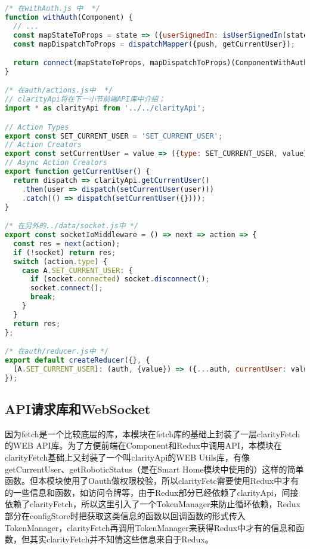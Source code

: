 \begin{lstlisting}[language={JavaScript}, label={lst:reduxDataFlow}, caption={Smart City模块权限校验Redux数据流相关代码}]
/* 在withAuth.js 中  */
function withAuth(Component) {
  // ...
  const mapStateToProps = state => ({userSignedIn: isUserSignedIn(state)});
  const mapDispatchToProps = dispatchMapper({push, getCurrentUser});

  return connect(mapStateToProps, mapDispatchToProps)(ComponentWithAuth);
}

/* 在auth/actions.js中  */
// clarityApi将在下一小节前端API库中介绍；
import * as clarityApi from '../../clarityApi';

// Action Types
export const SET_CURRENT_USER = 'SET_CURRENT_USER';
// Action Creators
export const setCurrentUser = value => ({type: SET_CURRENT_USER, value});
// Async Action Creators
export function getCurrentUser() {
  return dispatch => clarityApi.getCurrentUser()
    .then(user => dispatch(setCurrentUser(user)))
    .catch(() => dispatch(setCurrentUser({})));
}

/* 在另外的../data/socket.js中 */
export const socketIoMiddleware = () => next => action => {
  const res = next(action);
  if (!socket) return res;
  switch (action.type) {
    case A.SET_CURRENT_USER: {
      if (socket.connected) socket.disconnect();
      socket.connect();
      break;
    }
  }
  return res;
};

/* 在auth/reducer.js中 */
export default createReducer({}, {
  [A.SET_CURRENT_USER]: (auth, {value}) => ({...auth, currentUser: value}),
});
\end{lstlisting}
\subsection{API请求库和WebSocket}
因为fetch是一个比较底层的库，本模块在fetch库的基础上封装了一层clarityFetch的WEB API库。为了方便前端在Component和Redux中调用API，本模块在clarityFetch基础上又封装了一个叫clarityApi的WEB Utils库，有像getCurrentUser、getRoboticStatus（是在Smart Home模块中使用的）这样的简单函数。但本模块使用了Oauth做权限校验，所以clarityFetc需要使用Redux中才有的一些信息和函数，如访问令牌等，由于Redux部分已经依赖了clarityApi，间接依赖了clarityFetch，所以这里引入了一个TokenManager来防止循环依赖，Redux部分在configStore时把获取这类信息的函数以回调函数的形式传入TokenManager，clarityFetch再调用TokenManager来获得Redux中才有的信息和函数，但其实clarityFetch并不知情这些信息来自于Redux。

